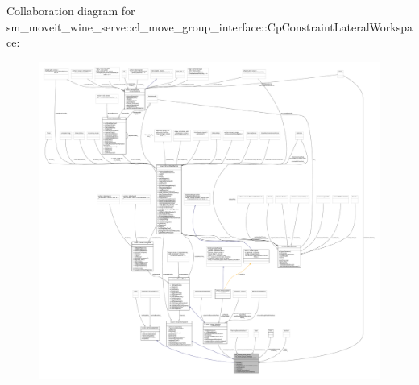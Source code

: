 Collaboration diagram for sm\+\_\+moveit\+\_\+wine\+\_\+serve\+:\+:cl\+\_\+move\+\_\+group\+\_\+interface\+:\+:Cp\+Constraint\+Lateral\+Workspace\+:
\nopagebreak
\begin{figure}[H]
\begin{center}
\leavevmode
\includegraphics[width=350pt]{classsm__moveit__wine__serve_1_1cl__move__group__interface_1_1CpConstraintLateralWorkspace__coll__graph}
\end{center}
\end{figure}
